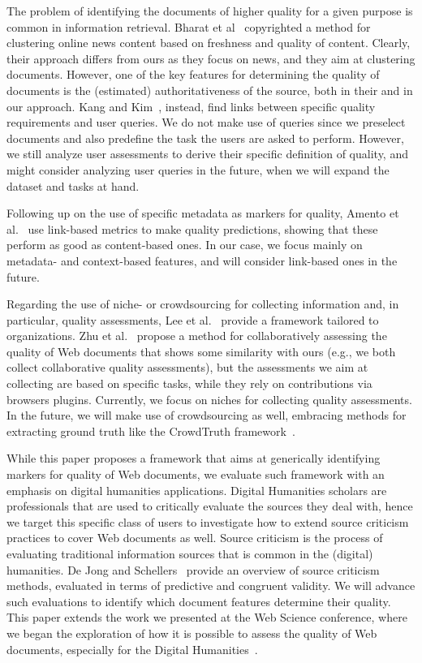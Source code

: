 \documentclass{llncs}
\begin{document}
The problem of identifying the documents of higher quality for a given purpose is common in information retrieval. Bharat et al~\cite{bharat2016method} copyrighted a method for clustering online news content based on freshness and quality of content. Clearly, their approach differs from ours as they focus on news, and they aim at clustering documents. However, one of the key features for determining the quality of documents is the (estimated) authoritativeness of the source, both in their and in our approach. Kang and Kim~\cite{Kang:2003:QTC:860435.860449}, instead, find links between specific quality requirements and user queries. We do not make use of queries since we preselect documents and also predefine the task the users are asked to perform. However, we still analyze user assessments to derive their specific definition of quality, and might consider analyzing user queries in the future, when we will expand the dataset and tasks at hand.

Following up on the use of specific metadata as markers for quality, Amento et al.~\cite{Amento:2000:LMQ:345508.345603} use link-based metrics to make quality predictions, showing that these perform as good as content-based ones. In our case, we focus mainly on metadata- and context-based features, and will consider link-based ones in the future.

Regarding the use of niche- or crowdsourcing for collecting information and, in particular, quality assessments, Lee et al.~\cite{Lee:2002:AMI:637474.637478} provide a framework tailored to organizations. Zhu et al.~\cite{zhu} propose a method for collaboratively assessing the quality of Web documents that shows some similarity with ours (e.g., we both collect collaborative quality assessments), but the assessments we aim at collecting are based on specific tasks, while they rely on contributions via browsers plugins. Currently, we focus on niches for collecting quality assessments. In the future, we will make use of crowdsourcing as well, embracing methods for extracting ground truth like the CrowdTruth framework~\cite{Inel2014}.


While this paper proposes a framework that aims at generically identifying markers for quality of Web documents, we evaluate such framework with an emphasis on digital humanities applications. Digital Humanities scholars are professionals that are used to critically evaluate the sources they deal with, hence we target this specific class of users to investigate how to extend source criticism practices to cover Web documents as well.
Source criticism is the process of evaluating traditional information sources that is common in the (digital) humanities. De Jong and Schellers~\cite{dejong} provide an overview of source criticism methods, evaluated in terms of predictive and congruent validity. We will advance such evaluations to identify which document features determine their quality.
This paper extends the work we presented at the Web Science conference, where we began the exploration of how it is possible to assess the quality of Web documents, especially for the Digital Humanities~\cite{Ceolin:2016:TWD:2908131.2908198}.
\end{document}
